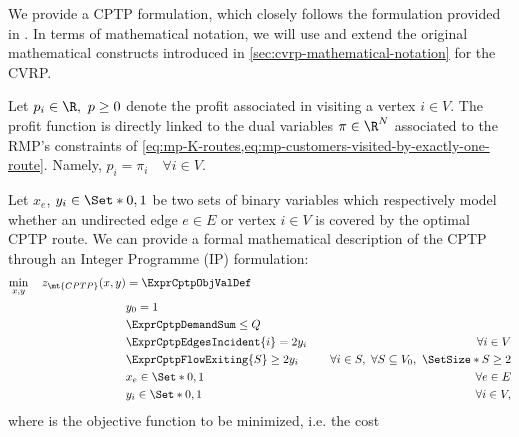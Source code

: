 We provide a CPTP formulation, which closely follows the formulation provided in \textcite{jepsen2014}.
In terms of mathematical notation, we will use and extend the original
mathematical constructs introduced in \cref{sec:cvrp-mathematical-notation} for the CVRP.

Let $p_i \in \R,\ p \ge 0$ denote the profit associated in visiting a vertex $i \in V$.
The profit function is directly linked to the dual variables $\pi \in \R^N$ associated to
the RMP's constraints of \cref{eq:mp-K-routes,eq:mp-customers-visited-by-exactly-one-route}.
Namely, $p_i = \pi_i \quad \forall i \in V$.

Let $x_{e}$, $y_{i} \in \Set*{0, 1}$ be two sets of binary variables which respectively
model whether an undirected edge $e \in E$ or vertex $i \in V$ is covered by the optimal CPTP route.
We can provide a formal mathematical description of the CPTP through an Integer Programme (IP) formulation:
\begin{align}
	\min_{x,y} \quad z_\mt{CPTP}(x, y) & = \ExprCptpObjValDef                     & \label{eq:cptp-obj-function}                                                                          \\
	                                   & y_0 = 1                                  & \label{eq:cptp-depot-part-of-tour-constraint}                                                         \\
	                                   & \ExprCptpDemandSum  \le Q                & \label{eq:cptp-resource-upper-bound-constraint}                                                       \\
	                                   & \ExprCptpEdgesIncident{i}  = 2 y_i       & \quad \forall i \in V         \label{eq:cptp-flow-conservation-constraint}                            \\
	                                   & \ExprCptpFlowExiting{S} \ge 2 y_{i}      & \quad \forall i \in S,\ \forall S \subseteq V_0,\ \SetSize*{S} \ge 2 \label{eq:cptp-gsec-constraints} \\
	                                   & x_{e}                   \in \Set*{0, 1}  & \quad \forall e \in E               \label{eq:cptp-x-mip-var-bounds}                                  \\
	                                   & y_{i}                    \in \Set*{0, 1} & \quad \forall i \in V             \label{eq:cptp-y-mip-var-bounds},
\end{align}
where  is the objective function to be minimized, i.e. the cost
